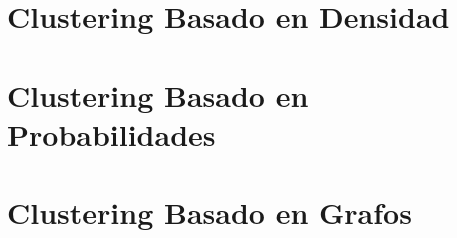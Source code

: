 \section{Clustering Basado en Densidad}\label{sec:Dbscan}


\section{Clustering Basado en Probabilidades}\label{sec:clusteringBasadoEnProbabilidades}


\section{Clustering Basado en Grafos}\label{sec:graphClustering}

